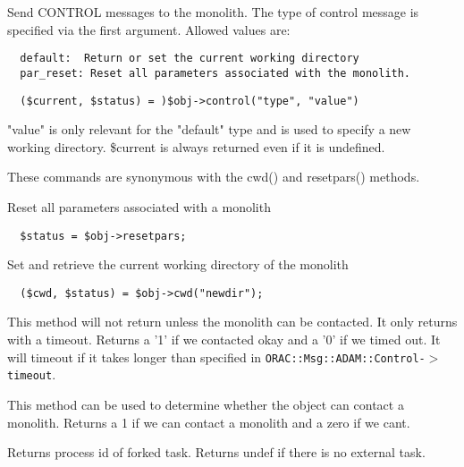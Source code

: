 \begin{description}
Send CONTROL messages to the monolith. The type of control
message is specified via the first argument. Allowed values are:

\begin{verbatim}
  default:  Return or set the current working directory
  par_reset: Reset all parameters associated with the monolith.
\end{verbatim}
\begin{verbatim}
  ($current, $status) = )$obj->control("type", "value")
\end{verbatim}


"value" is only relevant for the "default" type and is used
to specify a new working directory. \$current is always returned
even if it is undefined.



These commands are synonymous with the cwd() and resetpars()
methods.

\item[\textbf{resetpars}] \mbox{}

Reset all parameters associated with a monolith

\begin{verbatim}
  $status = $obj->resetpars;
\end{verbatim}
\item[\textbf{cwd}] \mbox{}

Set and retrieve the current working directory of the monolith

\begin{verbatim}
  ($cwd, $status) = $obj->cwd("newdir");
\end{verbatim}
\item[\textbf{contactw}] \mbox{}

This method will not return unless the monolith can be contacted.
It only returns with a timeout. Returns a '1' if we contacted okay
and a '0' if we timed out. It will timeout if it takes longer than
specified in \texttt{ORAC::Msg::ADAM::Control-$>$timeout}.

\item[\textbf{contact}] \mbox{}

This method can be used to determine whether the object can
contact a monolith. Returns a 1 if we can contact a monolith and
a zero if we cant.

\item[\textbf{pid}] \mbox{}

Returns process id of forked task.
Returns undef if there is no external task.

\end{description}

